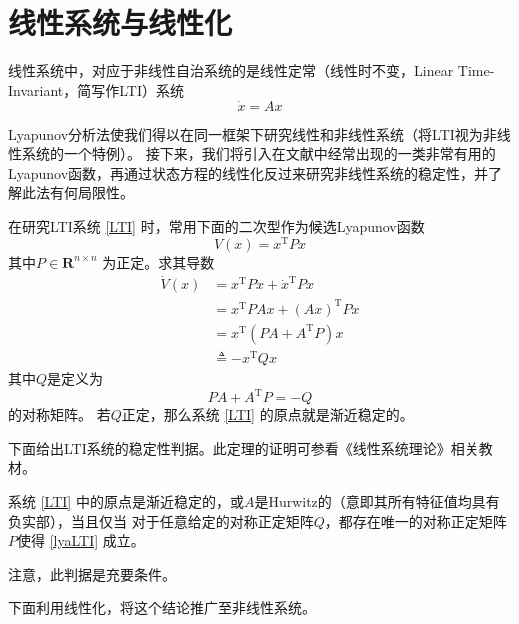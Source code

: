 \section{线性系统与线性化}\label{2Eref}
线性系统中，对应于非线性自治系统的是线性定常（线性时不变，Linear Time-Invariant，简写作LTI）系统
\begin{equation}\label{LTI}
    \dot{x}=Ax
\end{equation}

  Lyapunov分析法使我们得以在同一框架下研究线性和非线性系统（将LTI视为非线性系统的一个特例）。
 接下来，我们将引入在文献中经常出现的一类非常有用的Lyapunov函数，再通过状态方程的线性化反过来研究非线性系统的稳定性，并了解此法有何局限性。

  在研究LTI系统 \eqref{LTI} 时，常用下面的二次型作为候选Lyapunov函数
  \[ V (x) = x^\mathrm{T} P  x \]
  其中$P \in \mathbf{R}^{n \times n}$ 为正定。求其导数
  \begin{align*}
    \dot{V}(x)&= x^\mathrm{T}P\dot{x}+\dot{x}^\mathrm{T}Px\\
    &=x^\mathrm{T}PAx+(Ax)^\mathrm{T}Px\\
    &=x^\mathrm{T} (P  A + A^\mathrm{T} P) x \\
    &\triangleq - x^\mathrm{T} Q  x
  \end{align*}
  其中$Q$是定义为
  \begin{equation}
    P  A + A^\mathrm{T} P = - Q \label{lyaLTI}
  \end{equation}
  的对称矩阵。
  若$Q$正定，那么系统 \eqref{LTI} 的原点就是渐近稳定的。

  下面给出LTI系统的稳定性判据。此定理的证明可参看《线性系统理论》相关教材。
  
  \begin{theorem}[线性定常系统的稳定性判据]\label{linearlya}
    系统 \eqref{LTI} 中的原点是渐近稳定的，或$A$是Hurwitz的（意即其所有特征值均具有负实部），当且仅当
    对于任意给定的对称正定矩阵$Q$，都存在唯一的对称正定矩阵$P$使得 \eqref{lyaLTI} 成立。
  \end{theorem}
  \begin{note}
    注意，此判据是充要条件。
  \end{note}
  
  下面利用线性化，将这个结论推广至非线性系统。

